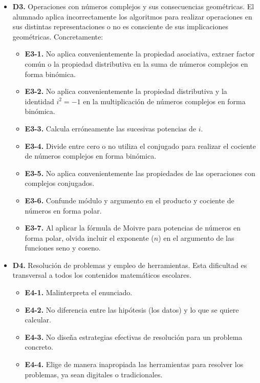 \documentclass[../main.tex]{memoir}
\begin{document}
\begin{itemize}
	\item \textbf{D3.} Operaciones con números complejos y sus consecuencias geométricas.
	El alumnado aplica incorrectamente los algoritmos para realizar operaciones en sus distintas representaciones o no es consciente de sus implicaciones geométricas. Concretamente:
	\begin{itemize}
		\item \textbf{E3-1.} No aplica convenientemente la propiedad asociativa, extraer factor común o la propiedad distributiva en la suma de números complejos en forma binómica.
		\item \textbf{E3-2.} No aplica convenientemente la propiedad distributiva y la identidad $i^2 = -1$ en la multiplicación de números complejos en forma binómica.
		\item \textbf{E3-3.} Calcula erróneamente las sucesivas potencias de $i$.
		\item \textbf{E3-4.} Divide entre cero o no utiliza el conjugado para realizar el cociente de números complejos en forma binómica.
		\item \textbf{E3-5.} No aplica convenientemente las propiedades de las operaciones con complejos conjugados.
		\item \textbf{E3-6.} Confunde módulo y argumento en el producto y cociente de números en forma polar.
		\item \textbf{E3-7.} Al aplicar la fórmula de Moivre para potencias de números en forma polar, olvida incluir el exponente ($n$) en el argumento de las funciones seno y coseno.
	\end{itemize}
	
	\item \textbf{D4.} Resolución de problemas y empleo de herramientas.
	Esta dificultad es transversal a todos los contenidos matemáticos escolares.
	\begin{itemize}
		\item \textbf{E4-1.} Malinterpreta el enunciado.
		\item \textbf{E4-2.} No diferencia entre las hipótesis (los datos) y lo que se quiere calcular.
		\item \textbf{E4-3.} No diseña estrategias efectivas de resolución para un problema concreto.
		\item \textbf{E4-4.} Elige de manera inapropiada las herramientas para resolver los problemas, ya sean digitales o tradicionales. 
	\end{itemize}
\end{itemize} 
\end{document}
